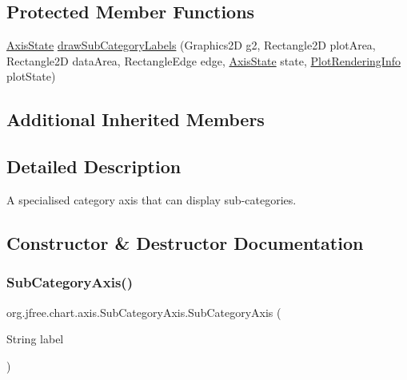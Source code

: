 \subsection*{Protected Member Functions}
\begin{DoxyCompactItemize}
\item 
\mbox{\hyperlink{classorg_1_1jfree_1_1chart_1_1axis_1_1_axis_state}{Axis\+State}} \mbox{\hyperlink{classorg_1_1jfree_1_1chart_1_1axis_1_1_sub_category_axis_aafd374209cdb55b5815034dae14b1abd}{draw\+Sub\+Category\+Labels}} (Graphics2D g2, Rectangle2D plot\+Area, Rectangle2D data\+Area, Rectangle\+Edge edge, \mbox{\hyperlink{classorg_1_1jfree_1_1chart_1_1axis_1_1_axis_state}{Axis\+State}} state, \mbox{\hyperlink{classorg_1_1jfree_1_1chart_1_1plot_1_1_plot_rendering_info}{Plot\+Rendering\+Info}} plot\+State)
\end{DoxyCompactItemize}
\subsection*{Additional Inherited Members}


\subsection{Detailed Description}
A specialised category axis that can display sub-\/categories. 

\subsection{Constructor \& Destructor Documentation}
\mbox{\label{classorg_1_1jfree_1_1chart_1_1axis_1_1_sub_category_axis_aa390eacde9febfc38334f4cbb459934f}} 
\subsubsection{\texorpdfstring{Sub\+Category\+Axis()}{SubCategoryAxis()}}
{\footnotesize\ttfamily org.\+jfree.\+chart.\+axis.\+Sub\+Category\+Axis.\+Sub\+Category\+Axis (\begin{DoxyParamCaption}\item[{String}]{label }\end{DoxyParamCaption})}

